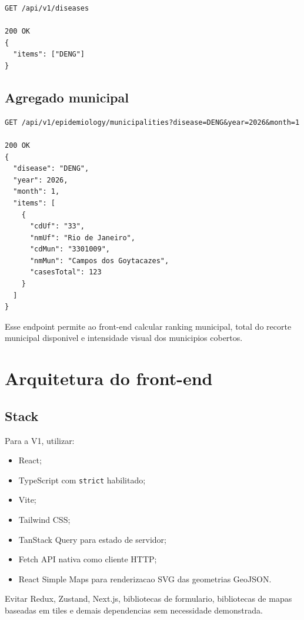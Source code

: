 \documentclass[12pt,a4paper]{article}
\begin{document}
\begin{lstlisting}
GET /api/v1/diseases

200 OK
{
  "items": ["DENG"]
}
\end{lstlisting}

\subsection{Agregado municipal}

\begin{lstlisting}
GET /api/v1/epidemiology/municipalities?disease=DENG&year=2026&month=1

200 OK
{
  "disease": "DENG",
  "year": 2026,
  "month": 1,
  "items": [
    {
      "cdUf": "33",
      "nmUf": "Rio de Janeiro",
      "cdMun": "3301009",
      "nmMun": "Campos dos Goytacazes",
      "casesTotal": 123
    }
  ]
}
\end{lstlisting}

Esse endpoint permite ao front-end calcular ranking municipal, total do recorte municipal disponivel e intensidade visual dos municipios cobertos.

\section{Arquitetura do front-end}

\subsection{Stack}

Para a V1, utilizar:

\begin{itemize}[leftmargin=*]
    \item React;
    \item TypeScript com \texttt{strict} habilitado;
    \item Vite;
    \item Tailwind CSS;
    \item TanStack Query para estado de servidor;
    \item Fetch API nativa como cliente HTTP;
    \item React Simple Maps para renderizacao SVG das geometrias GeoJSON.
\end{itemize}

Evitar Redux, Zustand, Next.js, bibliotecas de formulario, bibliotecas de mapas baseadas em tiles e demais dependencias sem necessidade demonstrada.
\end{document}
